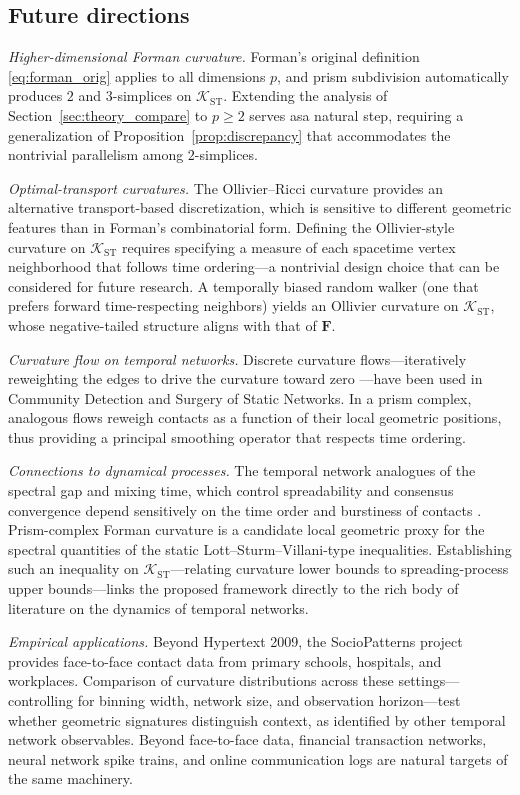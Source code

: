 \documentclass[
    pre,
    twocolumn,
    superscriptaddress,
    showpacs,
    nofootinbib,
    amsmath,
    amssymb,
    floatfix
]{revtex4-2}
\newcommand{\K}{\mathcal{K}}
\newcommand{\F}{\mathbf{F}}        %
\theoremstyle{plain} %
\theoremstyle{definition} %
\begin{document}
\subsection{Future directions}\label{ssec:future}
\textit{Higher-dimensional Forman curvature.}  Forman's original
definition \eqref{eq:forman_orig} applies to all dimensions $p$, and
prism subdivision automatically produces $2$ and $3$-simplices
on $\K_{\mathrm{ST}}$.  Extending the analysis of
Section~\ref{sec:theory_compare} to $p\geq 2$ serves asa natural step,
requiring a generalization of
Proposition~\ref{prop:discrepancy} that accommodates the nontrivial
parallelism among $2$-simplices.

\textit{Optimal-transport curvatures.}  The Ollivier--Ricci
curvature \cite{Ollivier2009} provides an alternative transport-based
discretization, which is sensitive to different geometric features
than in Forman's combinatorial form.  Defining the Ollivier-style
curvature on $\K_{\mathrm{ST}}$ requires specifying a measure of
each spacetime vertex neighborhood that follows time ordering---a
nontrivial design choice that can be considered for future research.  A temporally biased random walker (one that prefers forward time-respecting neighbors) yields an Ollivier curvature on
$\K_{\mathrm{ST}}$, whose negative-tailed structure aligns with that of
$\F$.

\textit{Curvature flow on temporal networks.}  Discrete curvature
flows---iteratively reweighting the edges to drive the curvature
toward zero \cite{Weber2017}---have been used in Community
Detection and Surgery of Static Networks.  In a prism complex, 
analogous flows reweigh contacts as a function of their
local geometric positions, thus providing a principal smoothing operator
that respects time ordering.

\textit{Connections to dynamical processes.}  The temporal network
analogues of the spectral gap and mixing time, which control
spreadability and consensus convergence depend
sensitively on the time order and burstiness of contacts
\cite{Karsai2011,Scholtes2014}.  Prism-complex Forman curvature
is a candidate local geometric proxy for the spectral
quantities of the static Lott--Sturm--Villani-type
inequalities.  Establishing such an inequality on
$\K_{\mathrm{ST}}$---relating curvature lower bounds to
spreading-process upper bounds---links the proposed framework directly
to the rich body of literature on the dynamics of temporal networks.

\textit{Empirical applications.}  Beyond Hypertext 2009, the
SocioPatterns project \cite{Cattuto2010} provides face-to-face
contact data from primary schools, hospitals, and workplaces.
Comparison of curvature distributions across these settings---controlling for binning width, network size, and observation
horizon---test whether geometric signatures distinguish
context, as identified by other temporal network observables.
Beyond face-to-face data, financial transaction networks, neural network spike trains, and online communication logs are natural targets of
the same machinery.
\end{document}
